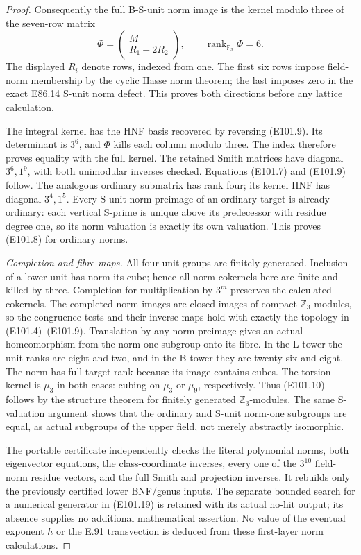 \begin{proof}
Consequently the full B-S-unit norm image is the
kernel modulo three of the seven-row matrix
\[
             \Phi=\begin{pmatrix}M\\R_1+2R_2\end{pmatrix},
             \qquad \operatorname{rank}_{\mathbb F_3}\Phi=6.
 \tag{E101.24}
\]
The displayed \(R_i\) denote rows, indexed from one.
The first six rows impose field-norm membership by
the cyclic Hasse norm theorem; the last imposes zero
in the exact E86.14 S-unit norm defect. This proves
both directions before any lattice calculation.

The integral kernel has the HNF basis recovered
by reversing (E101.9). Its determinant is \(3^6\),
and \(\Phi\) kills each column modulo three.
The index therefore proves equality with the full
kernel. The retained Smith matrices have diagonal
\(3^6,1^9\), with both unimodular inverses checked.
Equations (E101.7) and (E101.9) follow.
The analogous ordinary submatrix has rank four;
its kernel HNF has diagonal \(3^4,1^5\).
Every S-unit norm preimage of an ordinary target
is already ordinary: each vertical S-prime is
unique above its predecessor with residue degree
one, so its norm valuation is exactly its own
valuation. This proves (E101.8) for ordinary norms.

\emph{Completion and fibre maps.}
All four unit groups are finitely generated.
Inclusion of a lower unit has norm its cube;
hence all norm cokernels here are finite and killed
by three. Completion for multiplication by \(3^m\)
preserves the calculated cokernels. The completed
norm images are closed images of compact
\(\mathbb Z_3\)-modules, so the congruence tests and
their inverse maps hold with exactly the topology
in (E101.4)--(E101.9).
Translation by any norm preimage gives an actual
homeomorphism from the norm-one subgroup onto
its fibre. In the L tower the unit ranks are eight
and two, and in the B tower they are twenty-six
and eight. The norm has full target rank because
its image contains cubes. The torsion kernel is
\(\mu_3\) in both cases: cubing on \(\mu_3\) or
\(\mu_9\), respectively. Thus (E101.10) follows
by the structure theorem for finitely generated
\(\mathbb Z_3\)-modules. The same S-valuation argument
shows that the ordinary and S-unit norm-one
subgroups are equal, as actual subgroups of the
upper field, not merely abstractly isomorphic.

The portable certificate independently checks the
literal polynomial norms, both eigenvector equations,
the class-coordinate inverses, every one of the
\(3^{10}\) field-norm residue vectors, and the full
Smith and projection inverses. It rebuilds only
the previously certified lower BNF/genus inputs.
The separate bounded search for a numerical
generator in (E101.19) is retained with its actual
no-hit output; its absence supplies no additional
mathematical assertion. No value of the eventual
exponent \(h\) or the E.91 transvection is deduced
from these first-layer norm calculations.
\end{proof}
